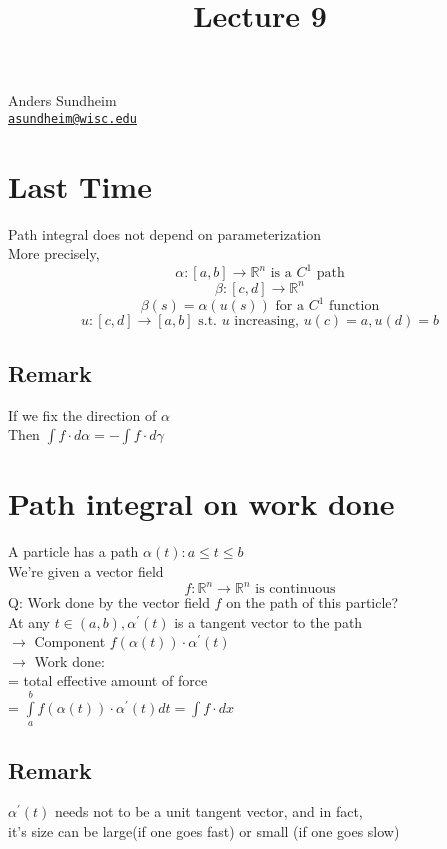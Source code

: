 \documentclass[12pt]{article}
\title{Lecture 9}
\newcommand{\BR}{\mathbb R}
\newcommand{\prm}{^\prime}
\begin{document}
\maketitle
\vspace*{-0.25in}
\begin{center}
	Anders Sundheim \\
	\href{mailto:asundheim@wisc.edu}{{\tt asundheim@wisc.edu}}
\end{center}
\section*{Last Time}
Path integral does not depend on parameterization \\
More precisely, \\
\[ \alpha:[a,b]\rightarrow\BR^n\text{ is a $C^1$ path} \]
\[ \beta:[c,d]\rightarrow\BR^n \]
\[ \beta(s)=\alpha(u(s))\text{ for a $C^1$ function} \]
\[ u:[c,d]\rightarrow[a,b]\text{ s.t. }u\text{ increasing, }u(c)=a,u(d)=b \]
\subsection*{Remark}
  If we fix the direction of $\alpha$ \\
  Then $\int f\cdot d\alpha=-\int f\cdot d\gamma$ \\
\section*{Path integral on work done}
  A particle has a path $\alpha(t):a\leq t \leq b$ \\
  We're given a vector field
  \[ f:\BR^n\rightarrow\BR^n\text{ is continuous} \]
  Q: Work done by the vector field $f$ on the path of this particle? \\
  At any $t\in(a,b), \alpha\prm(t)$ is a tangent vector to the path \\
  $\rightarrow$ Component $f(\alpha(t))\cdot\alpha\prm(t)$ \\
  $\rightarrow$ Work done: \\
  = total effective amount of force \\
  = $\int\limits_a^bf(\alpha(t))\cdot\alpha\prm(t)dt=\int f\cdot dx$ \\
  \subsection*{Remark}
    $\alpha\prm(t)$ needs not to be a unit tangent vector, and in fact, \\
    it's size can be large(if one goes fast) or small (if one goes slow) \\
\end{document}
